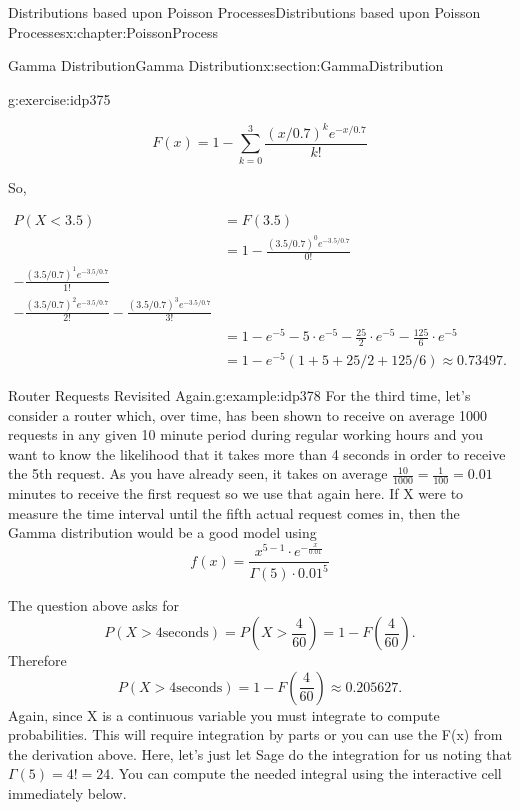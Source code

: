 \documentclass[oneside,10pt,]{book}
\numberwithin{equation}{section}
\newcommand{\lt}{<}
\newcommand{\gt}{>}
\newcommand{\amp}{&}
\begin{document}
\begin{chapterptx}{Distributions based upon Poisson Processes}{}{Distributions based upon Poisson Processes}{}{}{x:chapter:PoissonProcess}
\begin{sectionptx}{Gamma Distribution}{}{Gamma Distribution}{}{}{x:section:GammaDistribution}
\begin{inlineexercise}{}{g:exercise:idp375}
\par
%
\begin{equation*}
F(x) = 1 - \sum_{k=0}^3 \frac{ (x/0.7)^k e^{-x/0.7}}{k!}
\end{equation*}
%
\par
So,%
\par
%
\begin{equation*}
\begin{aligned}
P(X \lt 3.5) \amp  = F(3.5)\\
\amp  = 1 - \frac{ (3.5/0.7)^0 e^{-3.5/0.7}}{0!} \\ - \frac{ (3.5/0.7)^1 e^{-3.5/0.7}}{1!} \\ - \frac{ (3.5/0.7)^2 e^{-3.5/0.7}}{2!} - \frac{ (3.5/0.7)^3 e^{-3.5/0.7}}{3!}\\
\amp  = 1 - e^{-5} - 5 \cdot e^{-5} - \frac{25}{2} \cdot e^{-5} - \frac{125}{6} \cdot e^{-5}\\
\amp  = 1 - e^{-5} \left ( 1 + 5 + 25/2 + 125/6 \right ) \approx 0.73497.
\end{aligned}
\end{equation*}
%
\end{inlineexercise}%
\begin{example}{Router Requests Revisited Again.}{g:example:idp378}%
For the third time, let's consider a router which, over time, has been shown to receive on average 1000 requests in any given 10 minute period during regular working hours and you want to know the likelihood that it takes more than 4 seconds in order to receive the 5th request. As you have already seen, it takes on average \(\frac{10}{1000} = \frac{1}{100} = 0.01\) minutes to receive the first request so we use that again here. If X were to measure the time interval until the fifth actual request comes in, then the Gamma distribution would be a good model using%
\begin{equation*}
f(x) =  \frac{x^{5-1} \cdot e^{- \frac{x}{0.01}}}{\Gamma(5) \cdot 0.01^5}
\end{equation*}
%
\par
The question above asks for%
\begin{equation*}
P(X \gt 4 \text{seconds}) = P(X \gt \frac{4}{60} ) = 1 - F(\frac{4}{60}).
\end{equation*}
Therefore%
\begin{equation*}
P(X \gt 4 \text{seconds}) = 1 - F(\frac{4}{60}) \approx 0.205627.
\end{equation*}
Again, since X is a continuous variable you must integrate to compute probabilities. This will require integration by parts or you can use the F(x) from the derivation above. Here, let's just let Sage do the integration for us noting that \(\Gamma(5) = 4! = 24\). You can compute the needed integral using the interactive cell immediately below.%

\end{example}
\end{sectionptx}
\end{chapterptx}
\end{document}
